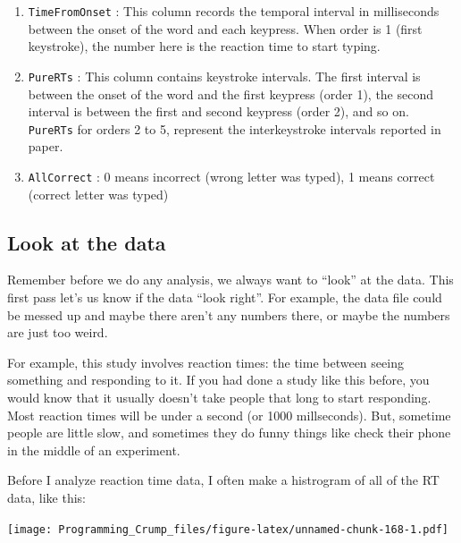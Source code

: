\documentclass[]{book}
\newenvironment{Shaded}{\begin{snugshade}}{\end{snugshade}}
\newcommand{\KeywordTok}[1]{\textcolor[rgb]{0.13,0.29,0.53}{\textbf{{#1}}}}
\newcommand{\NormalTok}[1]{{#1}}
\providecommand{\tightlist}{%
  \setlength{\itemsep}{0pt}\setlength{\parskip}{0pt}}
\theoremstyle{definition}
\theoremstyle{definition}
\theoremstyle{definition}
\theoremstyle{remark}
\begin{document}
\begin{enumerate}
\def\labelenumi{\arabic{enumi}.}
\tightlist
\item
  \texttt{TimeFromOnset} : This column records the temporal interval in
  milliseconds between the onset of the word and each keypress. When
  order is 1 (first keystroke), the number here is the reaction time to
  start typing.
\item
  \texttt{PureRTs} : This column contains keystroke intervals. The first
  interval is between the onset of the word and the first keypress
  (order 1), the second interval is between the first and second
  keypress (order 2), and so on. \texttt{PureRTs} for orders 2 to 5,
  represent the interkeystroke intervals reported in paper.
\item
  \texttt{AllCorrect} : 0 means incorrect (wrong letter was typed), 1
  means correct (correct letter was typed)
\end{enumerate}

\subsection{Look at the data}\label{look-at-the-data-3}

Remember before we do any analysis, we always want to ``look'' at the
data. This first pass let's us know if the data ``look right''. For
example, the data file could be messed up and maybe there aren't any
numbers there, or maybe the numbers are just too weird.

For example, this study involves reaction times: the time between seeing
something and responding to it. If you had done a study like this
before, you would know that it usually doesn't take people that long to
start responding. Most reaction times will be under a second (or 1000
millseconds). But, sometime people are little slow, and sometimes they
do funny things like check their phone in the middle of an experiment.

Before I analyze reaction time data, I often make a histrogram of all of
the RT data, like this:

\begin{Shaded}
\end{Shaded}

\texttt{[image: Programming\_Crump\_files/figure-latex/unnamed-chunk-168-1.pdf]}
\end{document}
